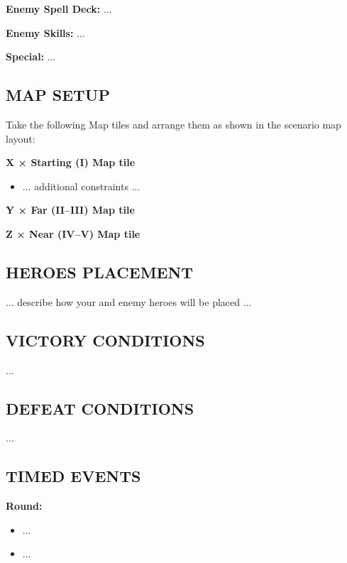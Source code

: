 \begin{multicols*}{2}
\textbf{Enemy Spell Deck:} ...

\textbf{Enemy Skills:} ...

\textbf{Special:} ...

\subsection*{\MakeUppercase{Map setup}}

Take the following Map tiles and arrange them as shown in the scenario map layout:

\textbf{X × Starting (I) Map tile}
\begin{itemize}
    \item ... additional constraints ...
\end{itemize}

\textbf{Y × Far (II--III) Map tile}

\textbf{Z × Near (IV--V) Map tile}

\subsection*{\MakeUppercase{Heroes placement}}

... describe how your and enemy heroes will be placed ...

\subsection*{\MakeUppercase{Victory Conditions}}
...

\subsection*{\MakeUppercase{Defeat Conditions}}
...

\subsection*{\MakeUppercase{Timed Events}}

\textbf{ Round:}
\begin{itemize}
  \item ...
  \item ...
\end{itemize}

%
%
%


\end{multicols*}
